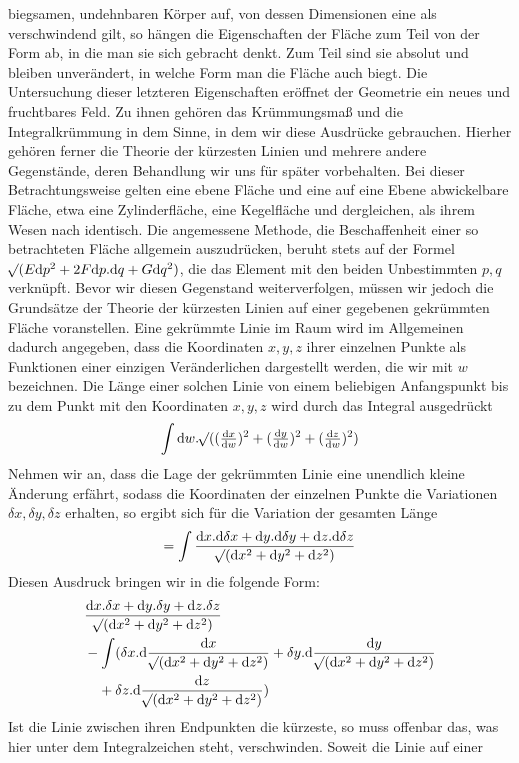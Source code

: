 %
biegsamen, undehnbaren Körper auf, von dessen Dimensionen eine als verschwindend gilt, so hängen die Eigenschaften der Fläche zum Teil von der Form ab, in die man sie sich gebracht denkt. Zum Teil sind sie absolut und bleiben unverändert, in welche Form man die Fläche auch biegt. Die Untersuchung dieser letzteren Eigenschaften eröffnet der Geometrie ein neues und fruchtbares Feld. Zu ihnen gehören das Krümmungsmaß und die Integralkrümmung in dem Sinne, in dem wir diese Ausdrücke gebrauchen. Hierher gehören ferner die Theorie der kürzesten Linien und mehrere andere Gegenstände, deren Behandlung wir uns für später vorbehalten. Bei dieser Betrachtungsweise gelten eine ebene Fläche und eine auf eine Ebene abwickelbare Fläche, etwa eine Zylinderfläche, eine Kegelfläche und dergleichen, als ihrem Wesen nach identisch. Die angemessene Methode, die Beschaffenheit einer so betrachteten Fläche allgemein auszudrücken, beruht stets auf der Formel \(\mathord{{}^{}\!\surd}(E\mathrm{d}p^2+2F\mathrm{d}p\mathord{.}\mathrm{d}q+G\mathrm{d}q^2)\), die das Element mit den beiden Unbestimmten \(p,q\) verknüpft. Bevor wir diesen Gegenstand weiterverfolgen, müssen wir jedoch die Grundsätze der Theorie der kürzesten Linien auf einer gegebenen gekrümmten Fläche voranstellen.
Eine gekrümmte Linie im Raum wird im Allgemeinen dadurch angegeben, dass die Koordinaten \(x,y,z\) ihrer einzelnen Punkte als Funktionen einer einzigen Veränderlichen dargestellt werden, die wir mit \(w\) bezeichnen. Die Länge einer solchen Linie von einem beliebigen Anfangspunkt bis zu dem Punkt mit den Koordinaten \(x,y,z\) wird durch das Integral ausgedrückt
\[
\int\mathrm{d}w\mathord{.}\mathord{{}^{}\!\surd}((\tfrac{\mathrm{d}x}{\mathrm{d}w})^2+(\tfrac{\mathrm{d}y}{\mathrm{d}w})^2+(\tfrac{\mathrm{d}z}{\mathrm{d}w})^2)
\]
Nehmen wir an, dass die Lage der gekrümmten Linie eine unendlich kleine Änderung erfährt, sodass die Koordinaten der einzelnen Punkte die Variationen \(\delta x,\delta y,\delta z\) erhalten, so ergibt sich für die Variation der gesamten Länge
\[
=\int\frac{\mathrm{d}x\mathord{.}\mathrm{d}\delta x+\mathrm{d}y\mathord{.}\mathrm{d}\delta y+\mathrm{d}z\mathord{.}\mathrm{d}\delta z}{\mathord{{}^{}\!\surd}(\mathrm{d}x^2+\mathrm{d}y^2+\mathrm{d}z^2)}
\]
Diesen Ausdruck bringen wir in die folgende Form:
\[
\begin{aligned}
&\frac{\mathrm{d}x\mathord{.}\delta x+\mathrm{d}y\mathord{.}\delta y+\mathrm{d}z\mathord{.}\delta z}{\mathord{{}^{}\!\surd}(\mathrm{d}x^2+\mathrm{d}y^2+\mathrm{d}z^2)}\\
&-\int(\delta x\mathord{.}\mathrm{d}\frac{\mathrm{d}x}{\mathord{{}^{}\!\surd}(\mathrm{d}x^2+\mathrm{d}y^2+\mathrm{d}z^2)}+\delta y\mathord{.}\mathrm{d}\frac{\mathrm{d}y}{\mathord{{}^{}\!\surd}(\mathrm{d}x^2+\mathrm{d}y^2+\mathrm{d}z^2)}\\
&\quad+\delta z\mathord{.}\mathrm{d}\frac{\mathrm{d}z}{\mathord{{}^{}\!\surd}(\mathrm{d}x^2+\mathrm{d}y^2+\mathrm{d}z^2)})
\end{aligned}
\]
Ist die Linie zwischen ihren Endpunkten die kürzeste, so muss offenbar das, was hier unter dem Integralzeichen steht, verschwinden. Soweit die Linie auf einer
